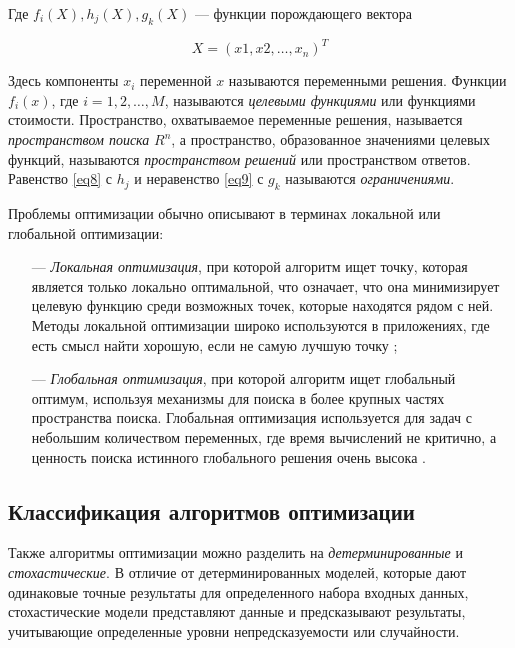 Где $f_i(X), h_j(X), g_k(X)$ — функции порождающего вектора

\begin{equation}\label{eq10}
    X = (x1,x2,\dots,x_n)^T
\end{equation}

Здесь компоненты $x_i$ переменной $x$ называются переменными решения.
Функции $f_i(x)$, где $i = 1, 2, \dots, M$, называются \emph{целевыми функциями}
или функциями стоимости. Пространство, охватываемое переменные решения,
называется \emph{пространством поиска} $R^n$, а пространство, образованное значениями
целевых функций, называются \emph{пространством решений} или пространством ответов.
Равенство \eqref{eq8} с $h_j$ и неравенство \eqref{eq9} с $g_k$ называются \emph{ограничениями}.

Проблемы оптимизации обычно описывают в терминах локальной или глобальной
оптимизации:

\begin{itemize}
    \item[—]
        \emph{Локальная оптимизация}, при которой алгоритм ищет точку, которая является
        только локально оптимальной, что означает, что она минимизирует целевую
        функцию среди возможных точек, которые находятся рядом с ней. Методы локальной оптимизации широко используются в приложениях, где есть смысл
        найти хорошую, если не самую лучшую точку \cite{Boyd2004};

    \item[—]
        \emph{Глобальная оптимизация}, при которой алгоритм ищет глобальный оптимум,
        используя механизмы для поиска в более крупных частях пространства поиска.
        Глобальная оптимизация используется для задач с небольшим количеством
        переменных, где время вычислений не критично, а ценность поиска истинного
        глобального решения очень высока \cite{Boyd2004}.
\end{itemize}

\subsection{Классификация алгоритмов оптимизации}

Также алгоритмы оптимизации можно разделить на \emph{детерминированные} и
\emph{стохастические}. В отличие от детерминированных моделей,
которые дают одинаковые точные результаты для определенного набора
входных данных, стохастические модели представляют данные и
предсказывают результаты, учитывающие определенные уровни
непредсказуемости или случайности.

